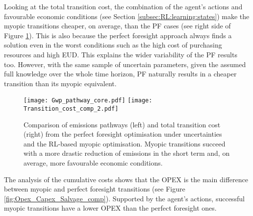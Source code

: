 Looking at the total transition cost, the combination of the agent's actions and favourable economic conditions (see Section \ref{subsec:RL:learning:states}) make the myopic transitions cheaper, on average, than the PF cases (see right side of Figure \ref{fig:Gwp_pathway_total_tran_cost}). This is also because the perfect foresight approach always finds a solution even in the worst conditions such as the high cost of purchasing resources and high \gls{EUD}. This explains the wider variability of the PF results too. However, with the same sample of uncertain parameters, given the assumed full knowledge over the whole time horizon, PF naturally results in a cheaper transition than its myopic equivalent.

\begin{figure}[!htbp]
\centering
\texttt{[image: Gwp\_pathway\_core.pdf]}
\texttt{[image: Transition\_cost\_comp\_2.pdf]}
\caption{Comparison of  emissions pathways (left) and total transition cost (right) from the perfect foresight optimisation under uncertainties and the \gls{RL}-based myopic optimisation. Myopic transitions succeed with a more drastic reduction of emissions in the short term and, on average, more favourable economic conditions.}
\label{fig:Gwp_pathway_total_tran_cost}
\end{figure}



\newpage
The analysis of the cumulative costs shows that the \gls{OPEX} is the main difference between myopic and perfect foresight transitions (see Figure \ref{fig:Opex_Capex_Salvage_comp}). Supported by the agent's actions, successful myopic transitions have a lower \gls{OPEX} than the perfect foresight ones.

